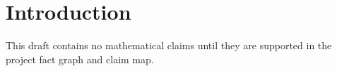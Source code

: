 \section{Introduction}
This draft contains no mathematical claims until they are supported in the project fact graph and claim map.
